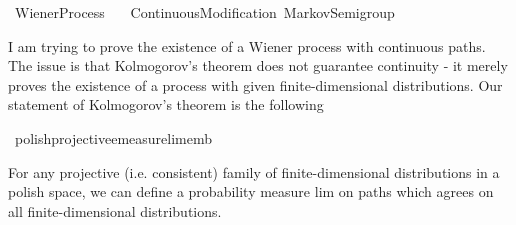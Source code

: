 %
\begin{isabellebody}%
%
%
\isadelimtheory
%
\endisadelimtheory
%
\isatagtheory
{}\isamarkupfalse%
\ Wiener{\isacharunderscore}{\kern0pt}Process\isanewline
\ \ \ Continuous{\isacharunderscore}{\kern0pt}Modification\ Markov{\isacharunderscore}{\kern0pt}Semigroup\isanewline
{}%
\endisatagtheory
{\isafoldtheory}%
%
\isadelimtheory
%
\endisadelimtheory
%
\begin{isamarkuptext}%
I am trying to prove the existence of a Wiener process with continuous paths.
  The issue is that Kolmogorov's theorem does not guarantee continuity - it merely proves the
  existence of a process with given finite-dimensional distributions. 
  Our statement of Kolmogorov's theorem is the following%
\end{isamarkuptext}\isamarkuptrue%
\isamarkupfalse%
\ polish{\isacharunderscore}{\kern0pt}projective{\isachardot}{\kern0pt}emeasure{\isacharunderscore}{\kern0pt}lim{\isacharunderscore}{\kern0pt}emb%
\begin{isamarkuptext}%
For any projective (i.e. consistent) family of finite-dimensional distributions in a polish 
  space, we can define a probability measure lim on paths which agrees on all finite-dimensional
  distributions.


\end{isamarkuptext}
\end{isabellebody}
